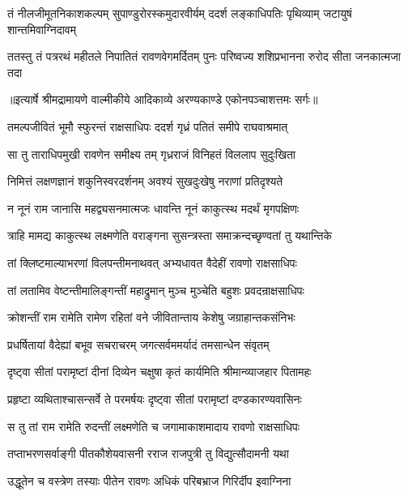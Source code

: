 \fourlineindentedshloka
{तं नीलजीमूतनिकाशकल्पम्}
{सुपाण्डुरोरस्कमुदारवीर्यम्}
{ददर्श लङ्काधिपतिः पृथिव्याम्}
{जटायुषं शान्तमिवाग्निदावम्} %

\fourlineindentedshloka
{ततस्तु तं पत्ररथं महीतले}
{निपातितं रावणवेगमर्दितम्}
{पुनः परिष्वज्य शशिप्रभानना}
{रुरोद सीता जनकात्मजा तदा} %


{॥इत्यार्षे श्रीमद्रामायणे वाल्मीकीये आदिकाव्ये अरण्यकाण्डे एकोनपञ्चाशत्तमः सर्गः॥}


\twolineshloka
{तमल्पजीवितं भूमौ स्फुरन्तं राक्षसाधिपः}
{ददर्श गृध्रं पतितं समीपे राघवाश्रमात्} %

\twolineshloka
{सा तु ताराधिपमुखी रावणेन समीक्ष्य तम्}
{गृध्रराजं विनिहतं विललाप सुदुःखिता} %

\twolineshloka
{निमित्तं लक्षणज्ञानं शकुनिस्वरदर्शनम्}
{अवश्यं सुखदुःखेषु नराणां प्रतिदृश्यते} %

\twolineshloka
{न नूनं राम जानासि महद्व्यसनमात्मजः}
{धावन्ति नूनं काकुत्स्थ मदर्थं मृगपक्षिणः} %

\twolineshloka
{त्राहि मामद्य काकुत्स्थ लक्ष्मणेति वराङ्गना}
{सुसन्त्रस्ता समाक्रन्दच्छृण्वतां तु यथान्तिके} %

\twolineshloka
{तां क्लिष्टमाल्याभरणां विलपन्तीमनाथवत्}
{अभ्यधावत वैदेहीं रावणो राक्षसाधिपः} %

\twolineshloka
{तां लतामिव वेष्टन्तीमालिङ्गन्तीं महाद्रुमान्}
{मुञ्च मुञ्चेति बहुशः प्रवदन्राक्षसाधिपः} %

\twolineshloka
{क्रोशन्तीं राम रामेति रामेण रहितां वने}
{जीवितान्ताय केशेषु जग्राहान्तकसंनिभः} %

\twolineshloka
{प्रधर्षितायां वैदेह्यां बभूव सचराचरम्}
{जगत्सर्वममर्यादं तमसान्धेन संवृतम्} %

\twolineshloka
{दृष्ट्वा सीतां परामृष्टां दीनां दिव्येन चक्षुषा}
{कृतं कार्यमिति श्रीमान्व्याजहार पितामहः} %

\twolineshloka
{प्रहृष्टा व्यथिताश्चासन्सर्वे ते परमर्षयः}
{दृष्ट्वा सीतां परामृष्टां दण्डकारण्यवासिनः} %

\twolineshloka
{स तु तां राम रामेति रुदन्तीं लक्ष्मणेति च}
{जगामाकाशमादाय रावणो राक्षसाधिपः} %

\twolineshloka
{तप्ताभरणसर्वाङ्गी पीतकौशेयवासनी}
{रराज राजपुत्री तु विद्युत्सौदामनी यथा} %

\twolineshloka
{उद्धूतेन च वस्त्रेण तस्याः पीतेन रावणः}
{अधिकं परिबभ्राज गिरिर्दीप इवाग्निना} %

